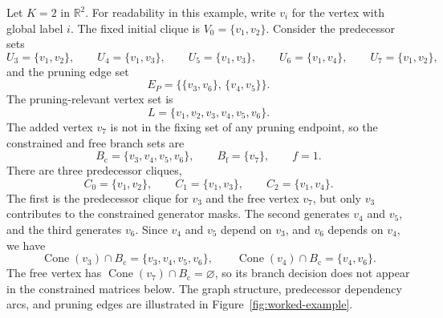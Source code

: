 \documentclass[11pt]{article}
\theoremstyle{plain}
\theoremstyle{definition}
\begin{document}
Let $K=2$ in $\mathbb{R}^2$. For readability in this example, write $v_i$ for the vertex with global label $i$. The fixed initial clique is $V_0=\{v_1, v_2\}$. Consider the predecessor sets
\[
U_3=\{v_1, v_2\},
\qquad
U_4=\{v_1, v_3\},
\qquad
U_5=\{v_1, v_3\},
\qquad
U_6=\{v_1, v_4\},
\qquad
U_7=\{v_1, v_2\},
\]
and the pruning edge set
\[
E_P=\{\{v_3, v_6\},\,\{v_4, v_5\}\}.
\]
The pruning-relevant vertex set is
\[
L=\{v_1,v_2,v_3,v_4,v_5,v_6\}.
\]
The added vertex $v_7$ is not in the fixing set of any pruning endpoint, so the constrained and free branch sets are
\[
B_{\mathrm{c}}=\{v_3, v_4, v_5, v_6\},
\qquad
B_{\mathrm{f}}=\{v_7\},
\qquad
f=1.
\]
There are three predecessor cliques,
\[
C_0=\{v_1, v_2\},
\qquad
C_1=\{v_1, v_3\},
\qquad
C_2=\{v_1, v_4\}.
\]
The first is the predecessor clique for $v_3$ and the free vertex $v_7$, but only $v_3$ contributes to the constrained generator masks. The second generates $v_4$ and $v_5$, and the third generates $v_6$. Since $v_4$ and $v_5$ depend on $v_3$, and $v_6$ depends on $v_4$, we have
\[
\operatorname{Cone}(v_3)\cap B_{\mathrm{c}}=\{v_3,v_4,v_5,v_6\},
\qquad
\operatorname{Cone}(v_4)\cap B_{\mathrm{c}}=\{v_4, v_6\}.
\]
The free vertex has $\operatorname{Cone}(v_7)\cap B_{\mathrm{c}}=\varnothing$, so its branch decision does not appear in the constrained matrices below.
The graph structure, predecessor dependency arcs, and pruning edges are illustrated in Figure~\ref{fig:worked-example}.
\end{document}
